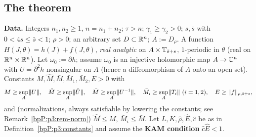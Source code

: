 \subsection{The theorem}\label{bpP:p3:statement}

\begin{proposition}\label{bpP:p3:two-scale-kam}
\textbf{Data.} Integers $n_1,n_2\ge1$, $n=n_1+n_2$; $\tau>n$; $\gamma_1\ge\gamma_2>0$; $s,\bar s$ with $0<4s\le\bar s<1$; $\rho>0$; an arbitrary set $D\subset\mathbb{R}^n$; $A:=D_\rho$.
A function $H(J,\theta)=h(J)+f(J,\theta)$, \emph{real analytic} on $A\times\mathbb{T}_{\bar s+s}$, $1$-periodic in $\theta$ (real on $\mathbb{R}^n\times\mathbb{R}^n$).
Let $\omega_0:=\partial h$; assume $\omega_0$ is an injective holomorphic map $A\to\mathbb{C}^n$ with $U=\partial^2h$ nonsingular on $A$ (hence a diffeomorphism of $A$ onto an open set).
Constants $M,\hat M,\bar M,\bar M_1,\bar M_2,E>0$ with
\[M\ge\sup_A\lVert U\rVert,\quad \hat M\ge\sup_A\lVert \hat U\rVert,\quad\bar M\ge\sup_A\lVert U^{-1}\rVert,\quad\bar M_i\ge\sup_A\lVert T_i\rVert\ (i=1,2),\quad E\ge\lVert f\rVert_{\rho,\bar s+s},\]
and (normalizations, always satisfiable by lowering the constants; see Remark~\ref{bpP:p3:rem-norm}) $\hat M\le M$, $\bar M_i\le\bar M$.
Let $L,K,\hat\rho,\hat E,\hat c$ be as in Definition~\ref{bpP:p3:constants} and assume the \textbf{KAM condition} $\hat c\hat E<1$.


\end{proposition}
